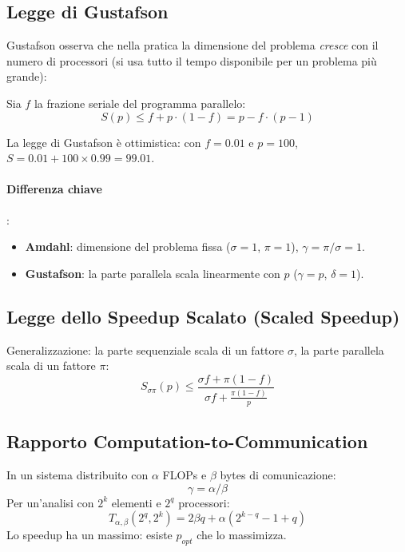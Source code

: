 \documentclass[11pt,a4paper]{article}
\theoremstyle{remark}
\begin{document}
\subsection{Legge di Gustafson}

Gustafson osserva che nella pratica la dimensione del problema \emph{cresce} con il numero di processori (si usa tutto il tempo disponibile per un problema più grande):

Sia $f$ la frazione seriale del programma parallelo:
\begin{equation}
  \boxed{S(p) \leq f + p \cdot (1-f) = p - f \cdot (p-1)}
\end{equation}

La legge di Gustafson è ottimistica: con $f=0.01$ e $p=100$, $S = 0.01 + 100 \times 0.99 = 99.01$.

\paragraph{Differenza chiave}:
\begin{itemize}
  \item \textbf{Amdahl}: dimensione del problema fissa ($\sigma=1$, $\pi=1$), $\gamma = \pi/\sigma = 1$.
  \item \textbf{Gustafson}: la parte parallela scala linearmente con $p$ ($\gamma = p$, $\delta = 1$).
\end{itemize}

\subsection{Legge dello Speedup Scalato (Scaled Speedup)}

Generalizzazione: la parte sequenziale scala di un fattore $\sigma$, la parte parallela scala di un fattore $\pi$:
\begin{equation}
  S_{\sigma\pi}(p) \leq \frac{\sigma f + \pi (1-f)}{\sigma f + \frac{\pi (1-f)}{p}}
\end{equation}

\subsection{Rapporto Computation-to-Communication}

In un sistema distribuito con $\alpha$ FLOPs e $\beta$ bytes di comunicazione:
\[
  \gamma = \alpha / \beta
\]
Per un'analisi con $2^k$ elementi e $2^q$ processori:
\[
  T_{\alpha,\beta}(2^q, 2^k) = 2\beta q + \alpha(2^{k-q} - 1 + q)
\]
Lo speedup ha un massimo: esiste $p_{opt}$ che lo massimizza.
\end{document}
